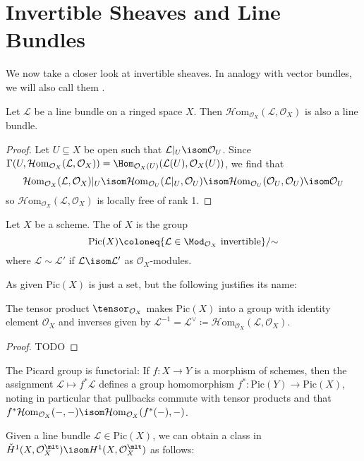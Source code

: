 \documentclass[wip, algebra]{bsteffan-lecturenotes}
\newcommand{\cO}{\mathcal{O}}
\newcommand{\cL}{\mathcal{L}}
\newcommand{\Pic}{\mathrm{Pic}}
\newcommand{\sHom}{\mathcal{H}\mathrm{om}}
\begin{document}
\section{Invertible Sheaves and Line Bundles}
We now take a closer look at invertible sheaves.
In analogy with vector bundles, we will also call them .
\begin{proposition}
	Let $\cL$ be a line bundle on a ringed space $X$. 
	Then $\sHom_{\cO_X}(\cL, \cO_X)$ is also a line bundle.
\end{proposition}
\begin{proof}
	Let $U \subseteq X$ be open such that $\cL|_U \isom \cO_U$.
	Since $\Gamma(U, \sHom_{\cO_X}(\cL, \cO_X)) = \Hom_{\cO_X(U)}(\cL(U), \cO_X(U))$, we find that 
	\begin{equation*}
		\sHom_{\cO_X}(\cL, \cO_X)|_U \isom \sHom_{\cO_U}(\cL|_U, \cO_U) \isom \sHom_{\cO_U}(\cO_U, \cO_U) \isom \cO_U
	\end{equation*}
	so $\sHom_{\cO_X}(\cL, \cO_X)$ is locally free of rank 1.
\end{proof}
\begin{definition}
	Let $X$ be a scheme.
	The  of $X$ is the group
	\begin{equation*}
		\Pic(X) \coloneq \{\cL \in \Mod_{\cO_X} \text{ invertible}\} / {{\sim}}
	\end{equation*}
	where $\cL \sim \cL'$ if $\cL \isom \cL'$ as $\cO_X$-modules.
\end{definition}
As given $\Pic(X)$ is just a set, but the following justifies its name:
\begin{proposition}
	The tensor product $\tensor_{\cO_X}$ makes $\Pic(X)$ into a group with identity element $\cO_X$ and inverses given by $\cL^{-1} = \cL^\vee \coloneq \sHom_{\cO_X}(\cL, \cO_X)$.
\end{proposition}
\begin{proof}
	TODO
\end{proof}
\begin{remark}
	The Picard group is functorial:
	If $f\colon X \to Y$ is a morphism of schemes, then the assignment $\cL \mapsto f^* \cL$ defines a group homomorphism $f^*\colon \Pic(Y) \to \Pic(X)$, noting in particular that pullbacks commute with tensor products and that $f^*\sHom_{\cO_X}({{-}}, {{-}}) \isom \sHom_{\cO_X}(f^*({{-}}), {{-}})$.
\end{remark}
Given a line bundle $\cL \in \Pic(X)$, we can obtain a class in $\check{H}^1(X, \cO_X^\mlt) \isom H^1(X, \cO_X^\mlt)$ as follows: 
\end{document}
